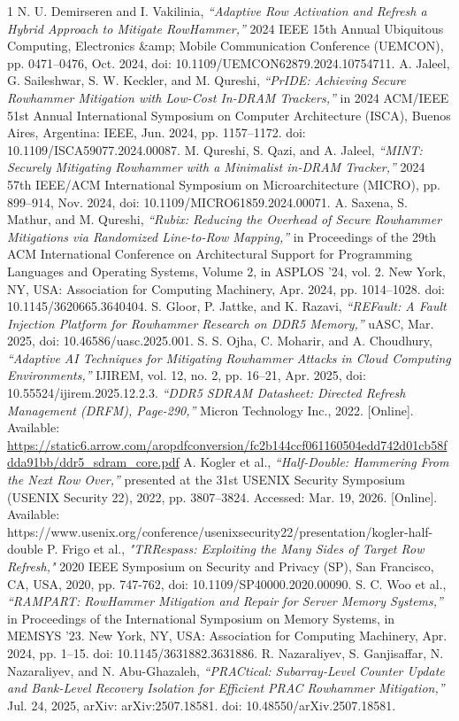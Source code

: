 \documentclass[journal,twocolumn]{IEEEtran}
\begin{document}
\begin{thebibliography}{1}
		N. U. Demirseren and I. Vakilinia, \textit{“Adaptive Row Activation and Refresh a Hybrid Approach to Mitigate RowHammer,”} 2024 IEEE 15th Annual Ubiquitous Computing, Electronics \&amp; Mobile Communication Conference (UEMCON), pp. 0471–0476, Oct. 2024, doi: 10.1109/UEMCON62879.2024.10754711.
		A. Jaleel, G. Saileshwar, S. W. Keckler, and M. Qureshi, \textit{“PrIDE: Achieving Secure Rowhammer Mitigation with Low-Cost In-DRAM Trackers,”} in 2024 ACM/IEEE 51st Annual International Symposium on Computer Architecture (ISCA), Buenos Aires, Argentina: IEEE, Jun. 2024, pp. 1157–1172. doi: 10.1109/ISCA59077.2024.00087.
		M. Qureshi, S. Qazi, and A. Jaleel, \textit{“MINT: Securely Mitigating Rowhammer with a Minimalist in-DRAM Tracker,”} 2024 57th IEEE/ACM International Symposium on Microarchitecture (MICRO), pp. 899–914, Nov. 2024, doi: 10.1109/MICRO61859.2024.00071.
		A. Saxena, S. Mathur, and M. Qureshi, \textit{“Rubix: Reducing the Overhead of Secure Rowhammer Mitigations via Randomized Line-to-Row Mapping,”} in Proceedings of the 29th ACM International Conference on Architectural Support for Programming Languages and Operating Systems, Volume 2, in ASPLOS ’24, vol. 2. New York, NY, USA: Association for Computing Machinery, Apr. 2024, pp. 1014–1028. doi: 10.1145/3620665.3640404.
		S. Gloor, P. Jattke, and K. Razavi, \textit{“REFault: A Fault Injection Platform for Rowhammer Research on DDR5 Memory,”} uASC, Mar. 2025, doi: 10.46586/uasc.2025.001.
		S. S. Ojha, C. Moharir, and A. Choudhury, \textit{“Adaptive AI Techniques for Mitigating Rowhammer Attacks in Cloud Computing Environments,”} IJIREM, vol. 12, no. 2, pp. 16–21, Apr. 2025, doi: 10.55524/ijirem.2025.12.2.3.
		\textit{“DDR5 SDRAM Datasheet: Directed Refresh Management (DRFM), Page-290,”} Micron Technology Inc., 2022. [Online]. Available: \url{https://static6.arrow.com/aropdfconversion/fc2b144ccf061160504edd742d01cb58fdda91bb/ddr5_sdram_core.pdf}
		A. Kogler et al., \textit{“Half-Double: Hammering From the Next Row Over,”} presented at the 31st USENIX Security Symposium (USENIX Security 22), 2022, pp. 3807–3824. Accessed: Mar. 19, 2026. [Online]. Available: https://www.usenix.org/conference/usenixsecurity22/presentation/kogler-half-double
		P. Frigo et al., \textit{"TRRespass: Exploiting the Many Sides of Target Row Refresh,"} 2020 IEEE Symposium on Security and Privacy (SP), San Francisco, CA, USA, 2020, pp. 747-762, doi: 10.1109/SP40000.2020.00090.
		S. C. Woo et al., \textit{“RAMPART: RowHammer Mitigation and Repair for Server Memory Systems,”} in Proceedings of the International Symposium on Memory Systems, in MEMSYS ’23. New York, NY, USA: Association for Computing Machinery, Apr. 2024, pp. 1–15. doi: 10.1145/3631882.3631886.
		R. Nazaraliyev, S. Ganjisaffar, N. Nazaraliyev, and N. Abu-Ghazaleh, \textit{“PRACtical: Subarray-Level Counter Update and Bank-Level Recovery Isolation for Efficient PRAC Rowhammer Mitigation,”} Jul. 24, 2025, arXiv: arXiv:2507.18581. doi: 10.48550/arXiv.2507.18581.
	\end{thebibliography}
	
\end{document}
